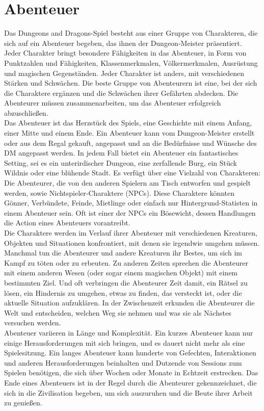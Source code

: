 \section{Abenteuer}
Das Dungeons and Dragons-Spiel besteht aus einer Gruppe von Charakteren, die sich auf ein Abenteuer begeben, das ihnen der Dungeon-Meister präsentiert. Jeder Charakter bringt besondere Fähigkeiten in das Abenteuer, in Form von Punktzahlen und Fähigkeiten, Klassenmerkmalen, Völkermerkmalen, Ausrüstung und magischen Gegenständen. Jeder Charakter ist anders, mit verschiedenen Stärken und Schwächen. Die beste Gruppe von Abenteurern ist eine, bei der sich die Charaktere ergänzen und die Schwächen ihrer Gefährten abdecken. Die Abenteurer müssen zusammenarbeiten, um das Abenteuer erfolgreich abzuschließen.\\
Das Abenteuer ist das Herzstück des Spiels, eine Geschichte mit einem Anfang, einer Mitte und einem Ende. Ein Abenteuer kann vom Dungeon-Meister erstellt oder aus dem Regal gekauft, angepasst und an die Bedürfnisse und Wünsche des DM angepasst werden. In jedem Fall bietet ein Abenteuer ein fantastisches Setting, sei es ein unterirdischer Dungeon, eine zerfallende Burg, ein Stück Wildnis oder eine blühende Stadt. Es verfügt über eine Vielzahl von Charakteren: Die Abenteurer, die von den anderen Spielern am Tisch entworfen und gespielt werden, sowie Nichtspieler-Charaktere (NPCs). Diese Charaktere könnten Gönner, Verbündete, Feinde, Mietlinge oder einfach nur Hintergrund-Statisten in einem Abenteuer sein. Oft ist einer der NPCs ein Bösewicht, dessen Handlungen die Action eines Abenteuers vorantreibt.\\
Die Charaktere werden im Verlauf ihrer Abenteuer mit verschiedenen Kreaturen, Objekten und Situationen konfrontiert, mit denen sie irgendwie umgehen müssen. Manchmal tun die Abenteurer und andere Kreaturen ihr Bestes, um sich im Kampf zu töten oder zu erbeuten. Zu anderen Zeiten sprechen die Abenteurer mit einem anderen Wesen (oder sogar einem magischen Objekt) mit einem bestimmten Ziel. Und oft verbringen die Abenteurer Zeit damit, ein Rätsel zu lösen, ein Hindernis zu umgehen, etwas zu finden, das versteckt ist, oder die aktuelle Situation aufzuklären. In der Zwischenzeit erkunden die Abenteurer die Welt und entscheiden, welchen Weg sie nehmen und was sie als Nächstes versuchen werden.\\
Abenteuer variieren in Länge und Komplexität. Ein kurzes Abenteuer kann nur einige Herausforderungen mit sich bringen, und es dauert nicht mehr als eine Spielesitzung. Ein langes Abenteuer kann hunderte von Gefechten, Interaktionen und anderen Herausforderungen beinhalten und Dutzende von Sessions zum Spielen benötigen, die sich über Wochen oder Monate in Echtzeit erstrecken. Das Ende eines Abenteuers ist in der Regel durch die Abenteurer gekennzeichnet, die sich in die Zivilisation begeben, um sich auszuruhen und die Beute ihrer Arbeit zu genießen.\\
